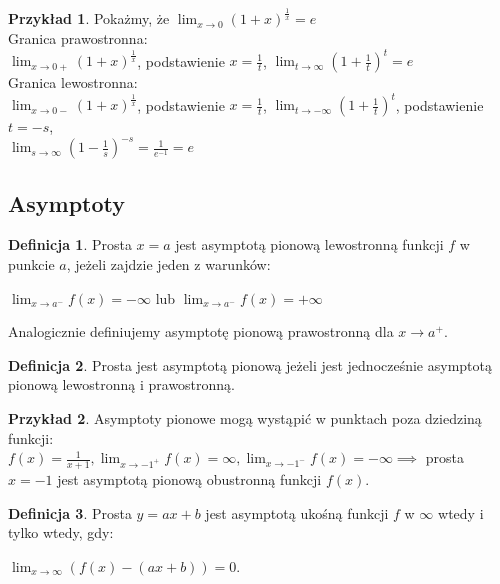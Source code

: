 \documentclass{article}
\theoremstyle{definition}
\newtheorem{de}{Definicja}[subsection]
\theoremstyle{definition}
\theoremstyle{definition}
\newtheorem{pk}{Przykład}[subsection]
\theoremstyle{definition}
\begin{document}
\begin{pk}
    Pokażmy, że $\lim_{x\rightarrow 0} (1+x)^{\frac{1}{x}} = e$\\
    Granica prawostronna:\\
    $\lim_{x\rightarrow 0+} (1+x)^{\frac{1}{x}}$, podstawienie $x=\frac{1}{t}$,
    $\lim_{t\rightarrow \infty} (1+\frac{1}{t})^{t}=e$\\
    Granica lewostronna: \\
    $\lim_{x\rightarrow 0-} (1+x)^{\frac{1}{x}}$, podstawienie $x=\frac{1}{t}$,
    $\lim_{t\rightarrow -\infty} (1+\frac{1}{t})^{t}$, podstawienie $t=-s$,\\
    $\lim_{s\rightarrow \infty} (1-\frac{1}{s})^{-s}=\frac{1}{e^{-1}}=e$
\end{pk}

\subsection{Asymptoty}

\begin{de}
    Prosta $x=a$ jest asymptotą pionową lewostronną funkcji $f$ w punkcie $a$,
    jeżeli zajdzie jeden z warunków:
    \begin{center}
        $\lim_{x\rightarrow a^-} f(x)=-\infty$ lub $\lim_{x\rightarrow a^-} f(x)=+\infty$
    \end{center}
    Analogicznie definiujemy asymptotę pionową prawostronną dla $x\rightarrow a^+$.
\end{de}

\begin{de}
    Prosta jest asymptotą pionową jeżeli jest jednocześnie asymptotą pionową lewostronną i prawostronną.
\end{de}

\begin{pk}
    Asymptoty pionowe mogą wystąpić w punktach poza dziedziną funkcji:\\
    $f(x)=\frac{1}{x+1}, \lim_{x\rightarrow -1^+} f(x) = \infty, \lim_{x\rightarrow -1^-} f(x) = -\infty \implies$ prosta $x=-1$ jest asymptotą pionową obustronną funkcji $f(x)$.
\end{pk}

\begin{de}
    Prosta $y=ax+b$ jest asymptotą ukośną funkcji $f$ w $\infty$ wtedy i tylko wtedy, gdy:
    \begin{center}
        $\lim_{x\rightarrow \infty} (f(x)-(ax+b))=0$. 
    \end{center}
\end{de}
\end{document}
